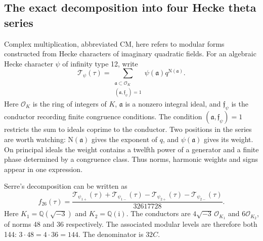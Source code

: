 \documentclass[a4paper,11pt]{article}
\theoremstyle{definition}
\newcommand{\Q}{\mathbb Q}
\newcommand{\T}{\mathcal T}
\newcommand{\norm}{\mathrm N}
\newcommand{\iu}{\mathrm i}
\begin{document}
\subsection{The exact decomposition into four Hecke theta series}
Complex multiplication, abbreviated CM, here refers to modular forms
constructed from Hecke characters of imaginary quadratic fields.
For an algebraic Hecke character \(\psi\) of infinity type 12, write
\begin{equation}\label{eq:Hecke}
 \T_\psi(\tau)
 =\sum_{\substack{\mathfrak a\subset\mathcal O_K\\
                  (\mathfrak a,\mathfrak f_\psi)=1}}
       \psi(\mathfrak a)q^{\norm(\mathfrak a)}.
\end{equation}
Here \(\mathcal O_K\) is the ring of integers of \(K\),
\(\mathfrak a\) is a nonzero integral ideal, and
\(\mathfrak f_\psi\) is the conductor recording finite congruence conditions.
The condition \((\mathfrak a,\mathfrak f_\psi)=1\) restricts the sum to ideals coprime to the conductor.
Two positions in the series are worth watching:
\(\norm(\mathfrak a)\) gives the exponent of \(q\), and
\(\psi(\mathfrak a)\) gives its weight.
On principal ideals the weight contains a twelfth power of a generator
and a finite phase determined by a congruence class.
Thus norms, harmonic weights and signs appear in one expression.

Serre's decomposition can be written as
\cite{Serre1985,KrishnamoorthyDalal2024}
\begin{equation}\label{eq:CMdecomposition}
 f_{26}(\tau)=
 \frac{\T_{\psi_{1+}}(\tau)+\T_{\psi_{1-}}(\tau)
      -\T_{\psi_{2+}}(\tau)-\T_{\psi_{2-}}(\tau)}
      {32617728}.
\end{equation}
Here \(K_1=\Q(\sqrt{-3})\) and \(K_2=\Q(\iu)\).
The conductors are \(4\sqrt{-3}\,\mathcal O_{K_1}\) and
\(6\mathcal O_{K_2}\), of norms 48 and 36 respectively.
The associated modular levels are therefore both 144:
\(3\cdot48=4\cdot36=144\). The denominator is \(32C\).
\end{document}
